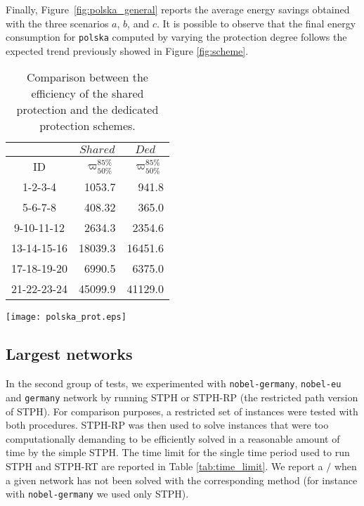 \documentclass[final,5p,times,twocolumn]{elsarticle}
\begin{document}
Finally, Figure~\ref{fig:polska_general} reports the average energy savings obtained with the three scenarios $a$, $b$, and $c$.  It is possible to observe that the final energy consumption for {\tt polska} computed by varying the protection degree follows the expected trend previously showed in Figure \ref{fig:scheme}.

\begin{table}[!ht]\footnotesize
\tabcolsep 6pt
\caption{Comparison between the efficiency of the shared protection and the dedicated protection schemes.}
\begin{center}
\begin{tabular}{crr}

\multicolumn{1}{c}{} & \multicolumn{1}{c}{$Shared$}& \multicolumn{1}{c}{$Ded$} \\
\hline
 ID   & $\varpi_{50\%}^{85\%}$	&  $\varpi_{50\%}^{85\%}$  \\
\hline                      
1-2-3-4     & 1053.7  &  941.8 \\
5-6-7-8     & 408.32  &  365.0 \\
9-10-11-12  & 2634.3  & 2354.6 \\
\hline
13-14-15-16 & 18039.3 &16451.6 \\
17-18-19-20 & 6990.5  & 6375.0 \\ 
21-22-23-24 & 45099.9 &41129.0 \\ 
\hline
\end{tabular}
\end{center}
\label{tab_sh_nominal}
\end{table}





\begin{figure*}[t]\centering
  \texttt{[image: polska\_prot.eps]}
  \caption{Energy savings achieved by STPH when implementing the different protection schemes on {\tt polska} instances.}
\label{fig:polska_general}
\end{figure*}


\subsection{Largest networks}\label{sec:large}

In the second group of tests, we experimented with {\tt nobel-germany}, {\tt nobel-eu} and {\tt germany} network by running STPH or STPH-RP (the restricted path version of STPH). For comparison purposes, a restricted set of instances were tested with both procedures. STPH-RP was then used to solve instances that were too computationally  demanding to be efficiently solved in a reasonable amount of time by the simple STPH. The time limit for the single time period used to run STPH and STPH-RT are reported in Table \ref{tab:time_limit}. We report a $/$ when a given network has not been solved with the corresponding method (for instance with {\tt nobel-germany} we used only STPH). 
\end{document}
